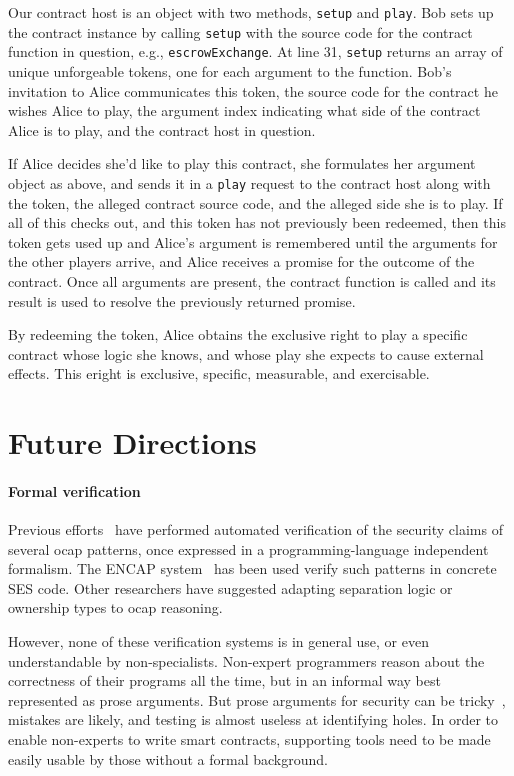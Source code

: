 \documentclass{llncs}
\begin{document}
Our contract host is an object with two methods, {\tt setup} and {\tt play}. Bob sets up the contract instance by calling {\tt setup} with the source code for the contract function in question, e.g., {\tt escrowExchange}. At line 31, {\tt setup} returns an array of unique unforgeable tokens, one for each argument to the function. Bob's invitation to Alice communicates this token, the source code for the contract he wishes Alice to play, the argument index indicating what side of the contract Alice is to play, and the contract host in question.

If Alice decides she'd like to play this contract, she formulates her argument object as above, and sends it in a {\tt play} request to the contract host along with the token, the alleged contract source code, and the alleged side she is to play. If all of this checks out, and this token has not previously been redeemed, then this token gets used up and Alice's argument is remembered until the arguments for the other players arrive, and Alice receives a promise for the outcome of the contract. Once all arguments are present, the contract function is called and its result is used to resolve the previously returned promise.

By redeeming the token, Alice obtains the exclusive right to play a specific contract whose logic she knows, and whose play she expects to cause external effects. This eright is exclusive, specific, measurable, and exercisable. 

\section{Future Directions}
\label{futureDirections}


\paragraph{Formal verification} 

Previous efforts~\cite{spiessens2007patterns,murray2010analysing} have performed automated verification of the security claims of several ocap patterns, once expressed in a programming-language independent formalism. The ENCAP system~\cite{taly2011automated} has been used verify such patterns in concrete SES code. Other researchers have suggested adapting separation logic or ownership types to ocap reasoning. 

However, none of these verification systems is in general use, or even understandable by non-specialists. Non-expert programmers reason about the correctness of their programs all the time, but in an informal way best represented as prose arguments. But prose arguments for security can be tricky~\cite{Mettler:EECS-2012-244}, mistakes are likely, and testing is almost useless at identifying holes. In order to enable non-experts to write smart contracts, supporting tools need to be made easily usable by those without a formal background.






% 

\end{document}

